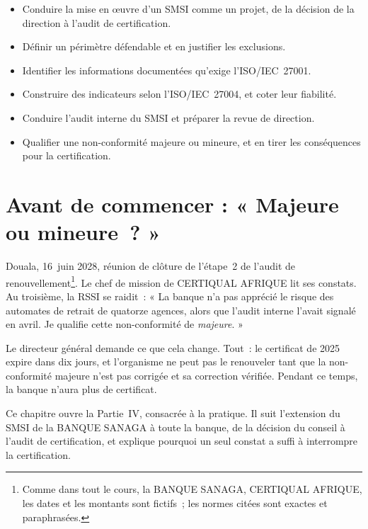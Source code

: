 \begin{boxobjectifs}
\begin{itemize}
    \item Conduire la mise en œuvre d'un SMSI comme un projet, de la
          décision de la direction à l'audit de certification.
    \item Définir un périmètre défendable et en justifier les exclusions.
    \item Identifier les informations documentées qu'exige
          l'ISO/IEC~27001.
    \item Construire des indicateurs selon l'ISO/IEC~27004, et coter leur
          fiabilité.
    \item Conduire l'audit interne du SMSI et préparer la revue de
          direction.
    \item Qualifier une non-conformité majeure ou mineure, et en tirer les
          conséquences pour la certification.
\end{itemize}
\end{boxobjectifs}

\bigskip

\section*{Avant de commencer : « Majeure ou mineure~? »}

Douala, 16~juin 2028, réunion de clôture de l'étape~2 de l'audit de
renouvellement\footnote{Comme dans tout le cours, la BANQUE SANAGA,
CERTIQUAL AFRIQUE, les dates et les montants sont fictifs~; les normes
citées sont exactes et paraphrasées.}. Le chef de mission de CERTIQUAL
AFRIQUE lit ses constats. Au troisième, la RSSI se raidit~: « La banque
n'a pas apprécié le risque des automates de retrait de quatorze agences,
alors que l'audit interne l'avait signalé en avril. Je qualifie cette
non-conformité de \emph{majeure}. »

Le directeur général demande ce que cela change. Tout~: le certificat
de 2025 expire dans dix jours, et l'organisme ne peut pas le renouveler
tant que la non-conformité majeure n'est pas corrigée et sa correction
vérifiée. Pendant ce temps, la banque n'aura plus de certificat.

\medskip

Ce chapitre ouvre la Partie~IV, consacrée à la pratique. Il suit
l'extension du SMSI de la BANQUE SANAGA à toute la banque, de la décision du
conseil à l'audit de certification, et explique pourquoi un seul constat a
suffi à interrompre la certification.

